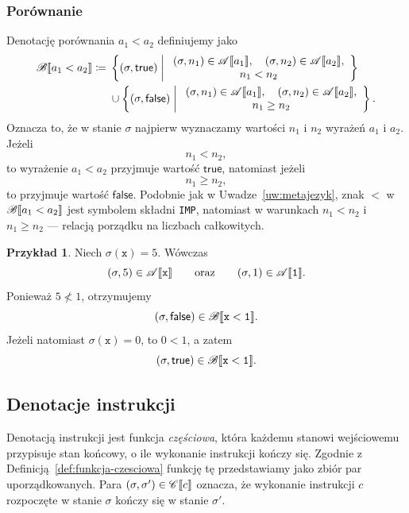 \documentclass[11pt,a4paper]{article}
\theoremstyle{definition}
\newtheorem{przyklad}[definicja]{Przykład}
\theoremstyle{plain}
\DeclarePairedDelimiter{\semdelim}{\llbracket}{\rrbracket}
\newcommand{\sem}[1]{\semdelim{#1}}
\newcommand{\Cc}{\mathscr{C}}   %
\newcommand{\Aa}{\mathscr{A}}   %
\newcommand{\Bb}{\mathscr{B}}   %
\newcommand{\kw}[1]{\ensuremath{\mathsf{#1}}} %
\begin{document}
\subsubsection{Porównanie}

Denotację porównania $a_1<a_2$ definiujemy jako
\[
\begin{aligned}
	\Bb\sem{a_1<a_2}
	\coloneqq{}&
	\left\{
	(\sigma,\kw{true})
	\;\middle|\;
	\begin{array}{c}
		(\sigma,n_1)\in\Aa\sem{a_1},\quad
		(\sigma,n_2)\in\Aa\sem{a_2},\\
		n_1<n_2
	\end{array}
	\right\}\\
	&\cup
	\left\{
	(\sigma,\kw{false})
	\;\middle|\;
	\begin{array}{c}
		(\sigma,n_1)\in\Aa\sem{a_1},\quad
		(\sigma,n_2)\in\Aa\sem{a_2},\\
		n_1\geq n_2
	\end{array}
	\right\}.
\end{aligned}
\]
Oznacza to, że w stanie $\sigma$ najpierw wyznaczamy wartości $n_1$ i $n_2$
wyrażeń $a_1$ i $a_2$. Jeżeli
\[
n_1<n_2,
\]
to wyrażenie $a_1<a_2$ przyjmuje wartość $\kw{true}$, natomiast jeżeli
\[
n_1\geq n_2,
\]
to przyjmuje wartość $\kw{false}$. Podobnie jak w Uwadze~\ref{uw:metajezyk},
znak $<$ w $\Bb\sem{a_1<a_2}$ jest symbolem składni \texttt{IMP}, natomiast
w warunkach $n_1<n_2$ i $n_1\geq n_2$ --- relacją porządku na liczbach
całkowitych.

\begin{przyklad}
	Niech $\sigma(\mathtt{x})=5$. Wówczas
	\[
	(\sigma,5)\in\Aa\sem{\mathtt{x}}
	\qquad\text{oraz}\qquad
	(\sigma,1)\in\Aa\sem{\mathtt{1}}.
	\]
	Ponieważ $5\not<1$, otrzymujemy
	\[
	(\sigma,\kw{false})\in\Bb\sem{\mathtt{x}<\mathtt{1}}.
	\]
	Jeżeli natomiast $\sigma(\mathtt{x})=0$, to $0<1$, a zatem
	\[
	(\sigma,\kw{true})\in\Bb\sem{\mathtt{x}<\mathtt{1}}.
	\]
\end{przyklad}

\subsection{Denotacje instrukcji}

Denotacją instrukcji jest funkcja \emph{częściowa}, która każdemu stanowi
wejściowemu przypisuje stan końcowy, o ile wykonanie instrukcji kończy się.
Zgodnie z Definicją~\ref{def:funkcja-czesciowa} funkcję tę przedstawiamy
jako zbiór par uporządkowanych. Para
$(\sigma,\sigma')\in\Cc\sem{c}$ oznacza, że wykonanie instrukcji $c$
rozpoczęte w stanie $\sigma$ kończy się w stanie $\sigma'$.
\end{document}
